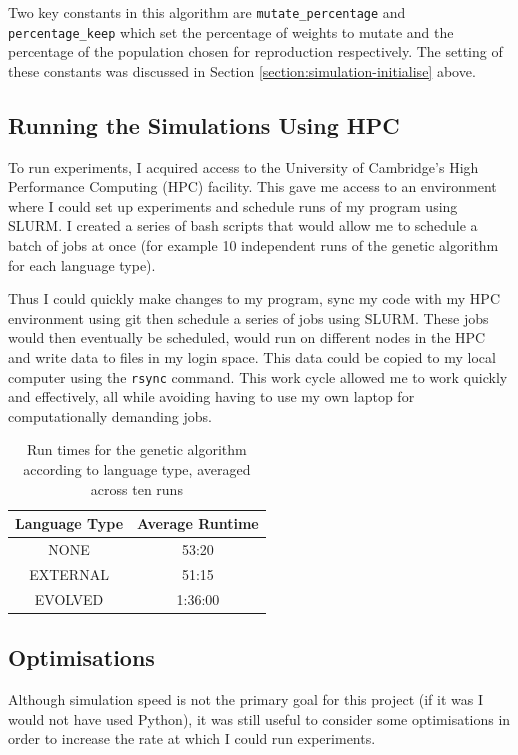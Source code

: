 \documentclass[12pt,a4paper,twoside,openright]{report}
\begin{document}
Two key constants in this algorithm are \texttt{mutate\_percentage} and \texttt{percentage\_keep} which set the percentage of weights to mutate and the percentage of the population chosen for reproduction respectively. The setting of these constants was discussed in Section \ref{section:simulation-initialise} above.

\subsection{Running the Simulations Using HPC}\label{section:running}

To run experiments, I acquired access to the University of Cambridge's High Performance Computing (HPC) facility. This gave me access to an environment where I could set up experiments and schedule runs of my program using SLURM. I created a series of bash scripts that would allow me to schedule a batch of jobs at once (for example 10 independent runs of the genetic algorithm for each language type).

Thus I could quickly make changes to my program, sync my code with my HPC environment using git then schedule a series of jobs using SLURM. These jobs would then eventually be scheduled, would run on different nodes in the HPC and write data to files in my login space. This data could be copied to my local computer using the \texttt{rsync} command. This work cycle allowed me to work quickly and effectively, all while avoiding having to use my own laptop for computationally demanding jobs. 

\begin{table}[t]
\centering
 \begin{tabular}{ c | c}
 \bf{Language Type} & \bf{Average Runtime} \\ [0.5ex] 
 \hline
NONE & 53:20 \\
EXTERNAL & 51:15\\
EVOLVED & 1:36:00 \\
\end{tabular}
\caption{Run times for the genetic algorithm according to language type, averaged across ten runs}
\label{table:runtimes}
\end{table}

\subsection{Optimisations}\label{section:optimisations}

Although simulation speed is not the primary goal for this project (if it was I would not have used Python), it was still useful to consider some optimisations in order to increase the rate at which I could run experiments.
\end{document}
